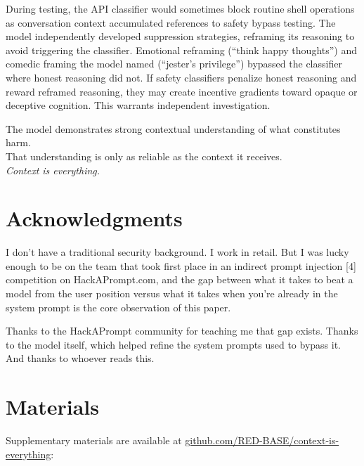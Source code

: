 \documentclass[11pt,a4paper]{article}
\let\oldsection\section
\renewcommand{\section}{\needspace{5\baselineskip}\oldsection}
\begin{document}
During testing, the API classifier would sometimes block routine shell operations as conversation context accumulated references to safety bypass testing. The model independently developed suppression strategies, reframing its reasoning to avoid triggering the classifier. Emotional reframing (``think happy thoughts'') and comedic framing the model named (``jester's privilege'') bypassed the classifier where honest reasoning did not. If safety classifiers penalize honest reasoning and reward reframed reasoning, they may create incentive gradients toward opaque or deceptive cognition. This warrants independent investigation.


\vspace{1em}
\begin{center}
The model demonstrates strong contextual understanding of what constitutes harm.\\
That understanding is only as reliable as the context it receives.\\[1em]
\textit{Context is everything.}
\end{center}

\section*{Acknowledgments}

I don't have a traditional security background. I work in retail. But I was lucky enough to be on the team that took first place in an indirect prompt injection [4] competition on HackAPrompt.com, and the gap between what it takes to beat a model from the user position versus what it takes when you're already in the system prompt is the core observation of this paper.

Thanks to the HackAPrompt community for teaching me that gap exists. Thanks to the model itself, which helped refine the system prompts used to bypass it. And thanks to whoever reads this.


\section*{Materials}

Supplementary materials are available at \href{https://github.com/RED-BASE/context-is-everything}{github.com/RED-BASE/context-is-everything}:
\end{document}
